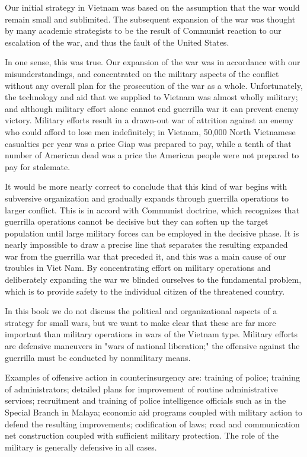 Our initial strategy in Vietnam was based on the assumption that the war would remain small and sublimited. The subsequent expansion of the war was thought by many academic strategists to be the result of Communist reaction to our escalation of the war, and thus the fault of the United States.

In one sense, this was true. Our expansion of the war was in accordance with our misunderstandings, and concentrated on the military aspects of the conflict without any overall plan for the prosecution of the war as a whole. Unfortunately, the technology and aid that we supplied to Vietnam was almost wholly military; and although military effort alone cannot end guerrilla war it can prevent enemy victory. Military efforts result in a drawn-out war of attrition against an enemy who could afford to lose men indefinitely; in Vietnam, 50,000 North Vietnamese casualties per year was a price Giap was prepared to pay, while a tenth of that number of American dead was a price the American people were not prepared to pay for stalemate.

It would be more nearly correct to conclude that this kind of war begins with subversive organization and gradually expands through guerrilla operations to larger conflict. This is in accord with Communist doctrine, which recognizes that guerrilla operations cannot be decisive but they can soften up the target population until large military forces can be employed in the decisive phase. It is nearly impossible to draw a precise line that separates the resulting expanded war from the guerrilla war that preceded it, and this was a main cause of our troubles in Viet Nam. By concentrating effort on military operations and deliberately expanding the war we blinded ourselves to the fundamental problem, which is to provide safety to the individual citizen of the threatened country.

In this book we do not discuss the political and organizational aspects of a strategy for small wars, but we want to make clear that these are far more important than military operations in wars of the Vietnam type. Military efforts are defensive maneuvers in "wars of national liberation;" the offensive against the guerrilla must be conducted by nonmilitary means.

Examples of offensive action in counterinsurgency are: training of police; training of administrators; detailed plans for improvement of routine administrative services; recruitment and training of police intelligence officials such as in the Special Branch in Malaya; economic aid programs coupled with military action to defend the resulting improvements; codification of laws; road and communication net construction coupled with sufficient military protection. The role of the military is generally defensive in all cases.

